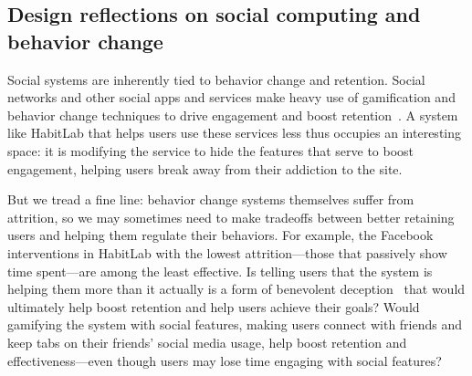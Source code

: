 
\subsection{Design reflections on social computing and behavior change}

Social systems are inherently tied to behavior change and retention. Social networks and other social apps and services make heavy use of gamification and behavior change techniques to drive engagement and boost retention~\cite{eyal2014hooked, chou2015actionable}. A system like HabitLab that helps users use these services less thus occupies an interesting space: it is modifying the service to hide the features that serve to boost engagement, helping users break away from their addiction to the site.

But we tread a fine line: behavior change systems themselves suffer from attrition, so we may sometimes need to make tradeoffs between better retaining users and helping them regulate their behaviors. For example, the Facebook interventions in HabitLab with the lowest attrition---those that passively show time spent---are among the least effective. %
Is telling users that the system is helping them more than it actually is a form of benevolent deception~\cite{adar2013benevolent} that would ultimately help boost retention and help users achieve their goals? Would gamifying the system with social features, making users connect with friends and keep tabs on their friends' social media usage, help boost retention and effectiveness---even though users may lose time engaging with social features?

